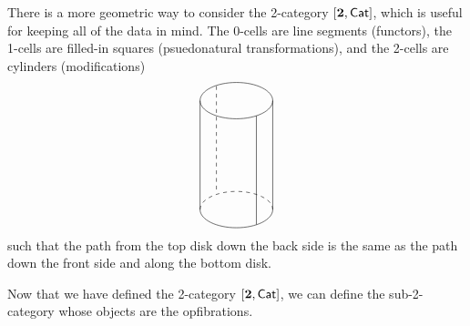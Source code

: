 \documentclass{amsart}
\begin{document}
There is a more geometric way to consider the 2-category
$ [\mathbf{2}, \mathsf{Cat}] $, which is useful for keeping all of the
data in mind.  The 0-cells are line segments (functors), the
1-cells are filled-in squares (psuedonatural
transformations), and the 2-cells are cylinders
(modifications)
\[
\begin{tikzpicture}
  \draw (0,0) ellipse (1 and 0.5);
  \draw (-1,0) -- (-1,-3);
  \draw (-1,-3) arc (180:360:1 and 0.5);
  \draw [dashed] (-1,-3) arc (180:360:1 and -0.5);
  \draw (1,-3) -- (1,0);
  \draw (0.55,-0.42) -- (0.55,-3.41);
  \draw [dashed] (-0.55,0.4) -- (-0.55,-2.5);
\end{tikzpicture}
\]
such that the path from the top disk down the back side is
the same as the path down the front side and along the
bottom disk.

Now that we have defined the 2-category $ [\mathbf{2},\mathsf{Cat}] $, we
can define the sub-2-category whose objects are the opfibrations.
\end{document}
